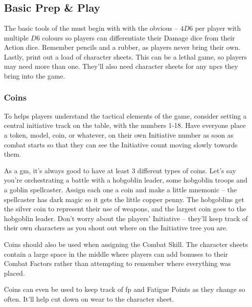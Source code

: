 \chapter{}

\section{Basic Prep \& Play}

\begin{multicols}{2}

\noindent
The basic tools of the  must begin with with the obvious -- $4D6$ per player with multiple $D6$ colours so players can differentiate their Damage dice from their Action dice.
Remember pencils and a rubber, as players never bring their own.
Lastly, print out a load of character sheets.
This can be a lethal game, so players may need more than one.
They'll also need character sheets for any \glspl{npc} they bring into the game.

\subsection{Coins}

To helps players understand the tactical elements of the game, consider setting a central initiative track on the table, with the numbers 1-18.
Have everyone place a token, model, coin, or whatever, on their own Initiative number as soon as combat starts so that they can see the Initiative count moving slowly towards them.

As a \gls{gm}, it's always good to have at least 3 different types of coins.
Let's say you're orchestrating a battle with a hobgoblin leader, some hobgoblin troops and a goblin spellcaster.
Assign each one a coin and make a little mnemonic -- the spellcaster has dark magic so it gets the little copper penny.
The hobgoblins get the silver coin to represent their use of weapons, and the largest coin goes to the hobgoblin leader.
Don't worry about the players' Initiative -- they'll keep track of their own characters as you shout out where on the Initiative tree you are.

Coins should also be used when assigning the Combat Skill.
The character sheets contain a large space in the middle where players can add bonuses to their Combat Factors rather than attempting to remember where everything was placed.

Coins can even be used to keep track of \gls{fp} and Fatigue Points as they change so often.
It'll help cut down on wear to the character sheet.


\end{multicols}
